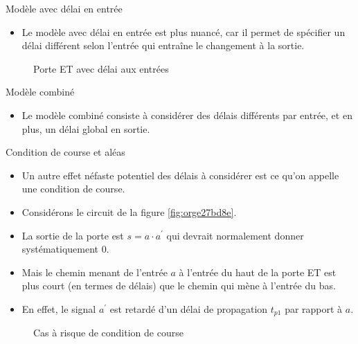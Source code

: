 \documentclass[presentation]{beamer}
\begin{document}
\begin{frame}[label={sec:org721ed1b}]{Modèle avec délai en entrée}
\begin{itemize}
\item Le modèle avec délai en entrée est plus nuancé, car il permet de spécifier un délai différent selon l'entrée qui entraîne le changement à la sortie.
\end{itemize}

\begin{figure}[htbp]
\centering

\caption{\label{fig:org7346948}Porte ET avec délai aux entrées}
\end{figure}
\end{frame}

\begin{frame}[label={sec:org5dc1648}]{Modèle combiné}
\begin{itemize}
\item Le modèle combiné consiste à considérer des délais différents par entrée, et en plus, un délai global en sortie.
\end{itemize}
\end{frame}

\begin{frame}[label={sec:org117aedc}]{Condition de course et aléas}
\begin{itemize}
\item Un autre effet néfaste potentiel des délais à considérer est ce qu'on appelle une \alert{condition de course}.

\item Considérons le circuit de la figure \ref{fig:orge27bd8e}.

\item La sortie de la porte est \(s = a \cdot a^\prime\) qui devrait normalement donner systématiquement 0.

\item Mais le chemin menant de l'entrée \(a\) à l'entrée du haut de la porte ET est plus court (en termes de délais) que le chemin qui mène à l'entrée du bas.

\item En effet, le signal \(a^\prime\) est retardé d'un délai de propagation \(t_{p1}\) par rapport à \(a\).
\end{itemize}

\begin{figure}[htbp]
\centering

\caption{\label{fig:orgaf2aa4d}Cas à risque de condition de course}
\end{figure}
\end{frame}
\end{document}
